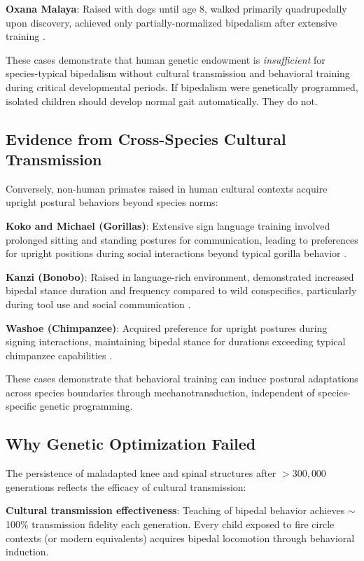 \textbf{Oxana Malaya}: Raised with dogs until age 8, walked primarily quadrupedally upon discovery, achieved only partially-normalized bipedalism after extensive training \citep{wilson2003nurture}.

These cases demonstrate that human genetic endowment is \textit{insufficient} for species-typical bipedalism without cultural transmission and behavioral training during critical developmental periods. If bipedalism were genetically programmed, isolated children should develop normal gait automatically. They do not.

\subsection{Evidence from Cross-Species Cultural Transmission}

Conversely, non-human primates raised in human cultural contexts acquire upright postural behaviors beyond species norms:

\textbf{Koko and Michael (Gorillas)}: Extensive sign language training involved prolonged sitting and standing postures for communication, leading to preferences for upright positions during social interactions beyond typical gorilla behavior \citep{patterson1978linguistic}.

\textbf{Kanzi (Bonobo)}: Raised in language-rich environment, demonstrated increased bipedal stance duration and frequency compared to wild conspecifics, particularly during tool use and social communication \citep{savage-rumbaugh1998apes}.

\textbf{Washoe (Chimpanzee)}: Acquired preference for upright postures during signing interactions, maintaining bipedal stance for durations exceeding typical chimpanzee capabilities \citep{gardner1989teaching}.

These cases demonstrate that behavioral training can induce postural adaptations across species boundaries through mechanotransduction, independent of species-specific genetic programming.

\subsection{Why Genetic Optimization Failed}

The persistence of maladapted knee and spinal structures after $>300,000$ generations reflects the efficacy of cultural transmission:

\textbf{Cultural transmission effectiveness}: Teaching of bipedal behavior achieves $\sim$100\% transmission fidelity each generation. Every child exposed to fire circle contexts (or modern equivalents) acquires bipedal locomotion through behavioral induction.

